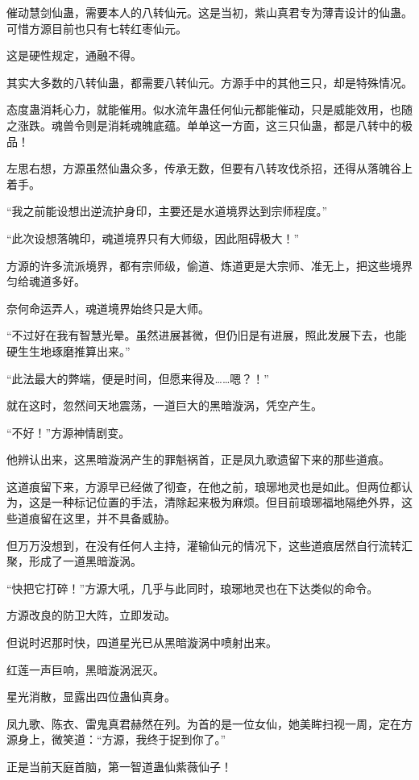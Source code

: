 \begin{this_body}
催动慧剑仙蛊，需要本人的八转仙元。这是当初，紫山真君专为薄青设计的仙蛊。可惜方源目前也只有七转红枣仙元。

这是硬性规定，通融不得。

其实大多数的八转仙蛊，都需要八转仙元。方源手中的其他三只，却是特殊情况。

态度蛊消耗心力，就能催用。似水流年蛊任何仙元都能催动，只是威能效用，也随之涨跌。魂兽令则是消耗魂魄底蕴。单单这一方面，这三只仙蛊，都是八转中的极品！

左思右想，方源虽然仙蛊众多，传承无数，但要有八转攻伐杀招，还得从落魄谷上着手。

“我之前能设想出逆流护身印，主要还是水道境界达到宗师程度。”

“此次设想落魄印，魂道境界只有大师级，因此阻碍极大！”

方源的许多流派境界，都有宗师级，偷道、炼道更是大宗师、准无上，把这些境界匀给魂道多好。

奈何命运弄人，魂道境界始终只是大师。

“不过好在我有智慧光晕。虽然进展甚微，但仍旧是有进展，照此发展下去，也能硬生生地琢磨推算出来。”

“此法最大的弊端，便是时间，但愿来得及……嗯？！”

就在这时，忽然间天地震荡，一道巨大的黑暗漩涡，凭空产生。

“不好！”方源神情剧变。

他辨认出来，这黑暗漩涡产生的罪魁祸首，正是凤九歌遗留下来的那些道痕。

这道痕留下来，方源早已经做了彻查，在他之前，琅琊地灵也是如此。但两位都认为，这是一种标记位置的手法，清除起来极为麻烦。但目前琅琊福地隔绝外界，这些道痕留在这里，并不具备威胁。

但万万没想到，在没有任何人主持，灌输仙元的情况下，这些道痕居然自行流转汇聚，形成了一道黑暗漩涡。

“快把它打碎！”方源大吼，几乎与此同时，琅琊地灵也在下达类似的命令。

方源改良的防卫大阵，立即发动。

但说时迟那时快，四道星光已从黑暗漩涡中喷射出来。

红莲一声巨响，黑暗漩涡泯灭。

星光消散，显露出四位蛊仙真身。

凤九歌、陈衣、雷鬼真君赫然在列。为首的是一位女仙，她美眸扫视一周，定在方源身上，微笑道：“方源，我终于捉到你了。”

正是当前天庭首脑，第一智道蛊仙紫薇仙子！

\end{this_body}

